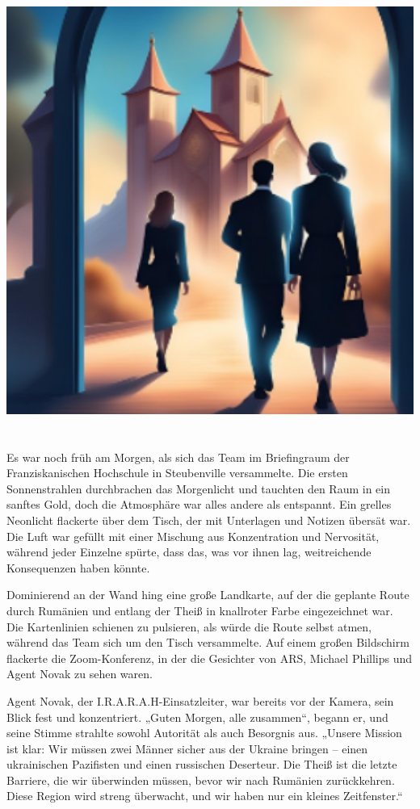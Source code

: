 \documentclass[
]{article}
\begin{document}
\includegraphics[width=6in,height=5.78125in]{media/image5.png}

Es war noch früh am Morgen, als sich das Team im Briefingraum der
Franziskanischen Hochschule in Steubenville versammelte. Die ersten
Sonnenstrahlen durchbrachen das Morgenlicht und tauchten den Raum in ein
sanftes Gold, doch die Atmosphäre war alles andere als entspannt. Ein
grelles Neonlicht flackerte über dem Tisch, der mit Unterlagen und
Notizen übersät war. Die Luft war gefüllt mit einer Mischung aus
Konzentration und Nervosität, während jeder Einzelne spürte, dass das,
was vor ihnen lag, weitreichende Konsequenzen haben könnte.

Dominierend an der Wand hing eine große Landkarte, auf der die geplante
Route durch Rumänien und entlang der Theiß in knallroter Farbe
eingezeichnet war. Die Kartenlinien schienen zu pulsieren, als würde die
Route selbst atmen, während das Team sich um den Tisch versammelte. Auf
einem großen Bildschirm flackerte die Zoom-Konferenz, in der die
Gesichter von ARS, Michael Phillips und Agent Novak zu sehen waren.

Agent Novak, der I.R.A.R.A.H-Einsatzleiter, war bereits vor der Kamera,
sein Blick fest und konzentriert. „Guten Morgen, alle zusammen``, begann
er, und seine Stimme strahlte sowohl Autorität als auch Besorgnis aus.
„Unsere Mission ist klar: Wir müssen zwei Männer sicher aus der Ukraine
bringen -- einen ukrainischen Pazifisten und einen russischen Deserteur.
Die Theiß ist die letzte Barriere, die wir überwinden müssen, bevor wir
nach Rumänien zurückkehren. Diese Region wird streng überwacht, und wir
haben nur ein kleines Zeitfenster.``
\end{document}
